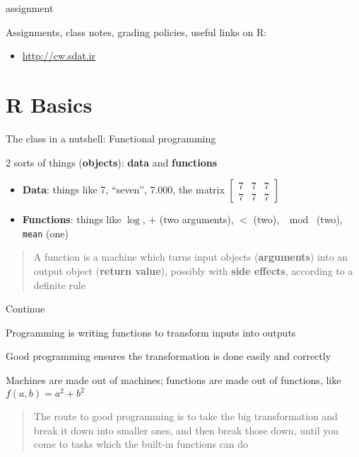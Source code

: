 \documentclass[8pt,ignorenonframetext,]{beamer}
\providecommand{\tightlist}{%
  \setlength{\itemsep}{0pt}\setlength{\parskip}{0pt}}
\begin{document}
\begin{frame}{assignment}

Assignments, class notes, grading policies, useful links on R:

\begin{itemize}
\tightlist
\item
  \url{http://cw.sdat.ir}
\end{itemize}

\end{frame}

\section{R Basics}\label{r-basics}

\begin{frame}[fragile]{The class in a nutshell: Functional programming}

2 sorts of things (\textbf{objects}): \textbf{data} and
\textbf{functions}

\begin{itemize}
\item
  \textbf{Data}: things like 7, ``seven'', \(7.000\), the matrix
  \(\left[ \begin{array}{ccc} 7 & 7 & 7 \\ 7 & 7 & 7\end{array}\right]\)
\item
  \textbf{Functions}: things like \(\log{}\), \(+\) (two arguments),
  \(<\) (two), \(\mod{}\) (two), \texttt{mean} (one)
\end{itemize}

\begin{quote}
A function is a machine which turns input objects (\textbf{arguments})
into an output object (\textbf{return value}), possibly with
\textbf{side effects}, according to a definite rule
\end{quote}

\end{frame}

\begin{frame}{Continue}

Programming is writing functions to transform inputs into outputs

Good programming ensures the transformation is done easily and correctly

Machines are made out of machines; functions are made out of functions,
like \(f(a,b) = a^2 + b^2\)

\begin{quote}
The route to good programming is to take the big transformation and
break it down into smaller ones, and then break those down, until you
come to tasks which the built-in functions can do
\end{quote}

\end{frame}
\end{document}
